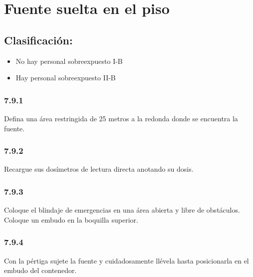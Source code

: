 \section*{Fuente suelta en el piso}

\subsection*{Clasificación:}
\begin{itemize}
    \item No hay personal sobreexpuesto I-B
    \item Hay personal sobreexpuesto II-B
\end{itemize}

\subsubsection*{7.9.1}
Defina una área restringida de 25 metros a la redonda donde se encuentra la fuente.

\subsubsection*{7.9.2}
Recargue sus dosímetros de lectura directa anotando su dosis.

\subsubsection*{7.9.3}
Coloque el blindaje de emergencias en una área abierta y libre de obstáculos. Coloque un embudo en la boquilla superior.

\subsubsection*{7.9.4}
Con la pértiga sujete la fuente y cuidadosamente llévela hasta posicionarla en el embudo del contenedor.